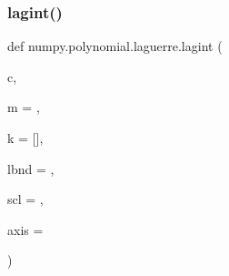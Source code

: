 \subsubsection{\texorpdfstring{lagint()}{lagint()}}
{\footnotesize\ttfamily def numpy.\+polynomial.\+laguerre.\+lagint (\begin{DoxyParamCaption}\item[{}]{c,  }\item[{}]{m = {},  }\item[{}]{k = {\ttfamily \mbox{[}\mbox{]}},  }\item[{}]{lbnd = {},  }\item[{}]{scl = {},  }\item[{}]{axis = {} }\end{DoxyParamCaption})}

